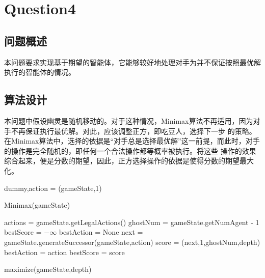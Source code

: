 \chapter{Question4}
\section{问题概述}
%
%
本问题要求实现基于期望的智能体，它能够较好地处理对手为并不保证按照最优解执行的智能体的情况。
%
%
%
%
\section{算法设计}
%
%
本问题中假设幽灵是随机移动的。对于这种情况，Minimax算法不再适用，因为对手不再保证执行最优解。对此，应该调整正方，即吃豆人，选择下一步
的策略。在Minimax算法中，选择的依据是“对手总是选择最优解”这一前提，而此时，对手的操作是完全随机的，即任何一个合法操作都等概率被执行。将这些
操作的效果综合起来，便是分数的期望，因此，正方选择操作的依据是使得分数的期望最大化。
\begin{algorithm}[h]
    dummy,action = \maximize(gameState,1)\;
    \caption{Minimax(gameState)}
\end{algorithm}

\begin{procedure}[h]
    \;
    actions = gameState.getLegalActions()\;
    ghostNum = gameState.getNumAgent - 1\;
    {}
    bestScore = $-\infty$\;
    bestAction = None\;
    {
        next = gameState.generateSuccessor(gameState,action)\;
        score = \randomMove(next,1,ghostNum,depth)\;
        {
            bestAction = action\;
            bestScore = score\;
        }
    }
    \caption{maximize(gameState,depth)}
\end{procedure}

